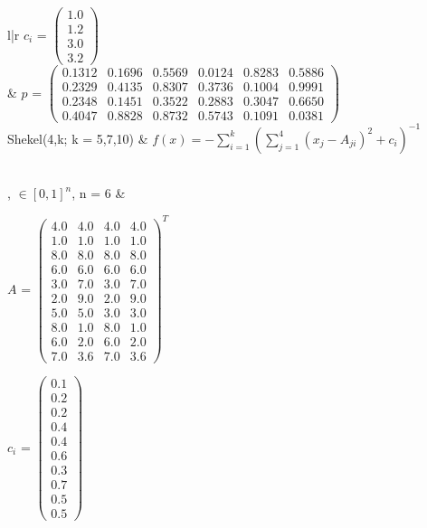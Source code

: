 \documentclass[fontsize=12, a4aper]{scrartcl}
\newcommand\Tstrut{\rule{0pt}{3ex}}           %
\begin{document}
\begin{table}[H]
\begin{tabularx}{\textwidth}{l|r}
			\(c_i\) =		\(\begin{pmatrix}
			1.0\\
			1.2\\
			3.0\\
			3.2
			\end{pmatrix}\)\\
			
			& \(p\) = 		\(\begin{pmatrix}
			0.1312 & 0.1696 & 0.5569 & 0.0124 & 0.8283 & 0.5886\\
			0.2329 & 0.4135 & 0.8307 & 0.3736 & 0.1004 & 0.9991\\
			0.2348 & 0.1451 & 0.3522 & 0.2883 & 0.3047 & 0.6650\\
			0.4047 & 0.8828 & 0.8732 & 0.5743 & 0.1091 & 0.0381
			\end{pmatrix}\)\\
			Shekel(4,k; k = 5,7,10) & \(f(x) = -\sum_{i=1}^{k}(\sum_{j=1}^{4} (x_j - A_{ji})^2 + c_i)^{-1}\)\Tstrut\\
			, \(\in [0,1]^n\), n = 6 &
			
			\(A\) = 		\(\begin{pmatrix}
			4.0 & 4.0 & 4.0 & 4.0\\
			1.0 & 1.0 & 1.0 & 1.0\\
			8.0 & 8.0 & 8.0 & 8.0\\
			6.0 & 6.0 & 6.0 & 6.0\\
			3.0 & 7.0 & 3.0 & 7.0\\
			2.0 & 9.0 & 2.0 & 9.0\\
			5.0 & 5.0 & 3.0 & 3.0\\
			8.0 & 1.0 & 8.0 & 1.0\\
			6.0 & 2.0 & 6.0 & 2.0\\
			7.0 & 3.6 & 7.0 & 3.6
			\end{pmatrix}^T\)
			
			\(c_i\) =		\(\begin{pmatrix}
			0.1\\
			0.2\\
			0.2\\
			0.4\\
			0.4\\
			0.6\\
			0.3\\
			0.7\\
			0.5\\
			0.5
			\end{pmatrix}\)
			
		\end{tabularx}
		
	\end{table}
	
\end{document}

